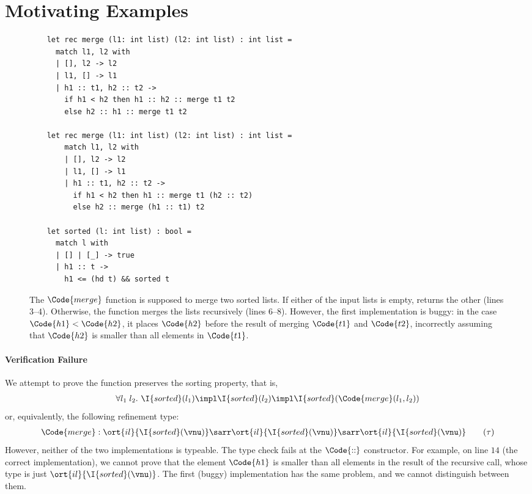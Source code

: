 \section{Motivating Examples}

\begin{figure}[!t]
    \begin{verbatim}
    let rec merge (l1: int list) (l2: int list) : int list =
      match l1, l2 with
      | [], l2 -> l2
      | l1, [] -> l1
      | h1 :: t1, h2 :: t2 ->
        if h1 < h2 then h1 :: h2 :: merge t1 t2
        else h2 :: h1 :: merge t1 t2
    
    let rec merge (l1: int list) (l2: int list) : int list =
        match l1, l2 with
        | [], l2 -> l2
        | l1, [] -> l1
        | h1 :: t1, h2 :: t2 ->
          if h1 < h2 then h1 :: merge t1 (h2 :: t2)
          else h2 :: merge (h1 :: t1) t2

    let sorted (l: int list) : bool =
      match l with
      | [] | [_] -> true
      | h1 :: t ->
        h1 <= (hd t) && sorted t
    \end{verbatim}
    \caption{
    The $\Code{merge}$ function is supposed to merge two sorted lists. If either of the input lists is empty,  returns the other (lines $3$--$4$). Otherwise, the function merges the lists recursively (lines $6$--$8$). However, the first implementation is buggy: in the case $\Code{h1} < \Code{h2}$, it places $\Code{h2}$ before the result of merging $\Code{t1}$ and $\Code{t2}$, incorrectly assuming that $\Code{h2}$ is smaller than all elements in $\Code{t1}$. }
    \label{fig:motivation}
\end{figure}

\paragraph{Verification Failure} We attempt to prove the  function preserves the sorting property, that is,
\begin{align*}
    \forall l_1\;l_2.\ \I{sorted}(l_1) \impl \I{sorted}(l_2) \impl \I{sorted}(\Code{merge}(l_1, l_2))
\end{align*}\noindent
or, equivalently, the following refinement type:
\begin{align*}
    \Code{merge} : \ort{il}{\I{sorted}(\vnu)} \sarr \ort{il}{\I{sorted}(\vnu)} \sarr \ort{il}{\I{sorted}(\vnu)} \tag{$\tau$}
\end{align*}\noindent
However, neither of the two implementations is typeable. The type check fails at the $\Code{::}$ constructor. For example, on line $14$ (the correct implementation), we cannot prove that the element $\Code{h1}$ is smaller than all elements in the result of the recursive call, whose type is just $\ort{il}{\I{sorted}(\vnu)}$. The first (buggy) implementation has the same problem, and we cannot distinguish between them.

